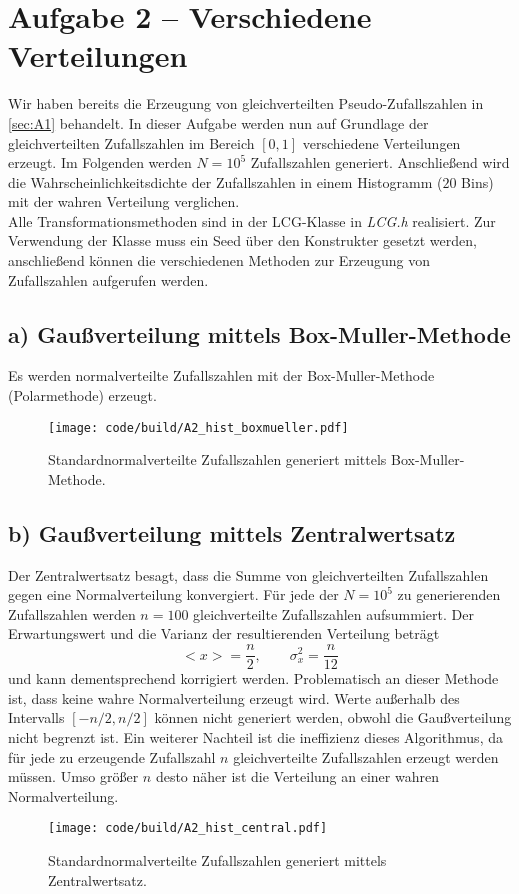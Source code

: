 \section{Aufgabe 2 – Verschiedene Verteilungen}
\label{sec:A2}
Wir haben bereits die Erzeugung von gleichverteilten Pseudo-Zufallszahlen in \autoref{sec:A1} behandelt.
In dieser Aufgabe werden nun auf Grundlage der gleichverteilten Zufallszahlen im Bereich $[0,1]$ verschiedene Verteilungen erzeugt.
Im Folgenden werden $N = 10^5$ Zufallszahlen generiert.
Anschließend wird die Wahrscheinlichkeitsdichte der Zufallszahlen in einem Histogramm ($20$ Bins) mit der wahren Verteilung verglichen.
\\
Alle Transformationsmethoden sind in der LCG-Klasse in \textit{LCG.h} realisiert.
Zur Verwendung der Klasse muss ein Seed über den Konstrukter gesetzt werden, anschließend können die verschiedenen Methoden zur Erzeugung von Zufallszahlen aufgerufen werden.

\subsection{a) Gaußverteilung mittels Box-Muller-Methode}
Es werden normalverteilte Zufallszahlen mit der Box-Muller-Methode (Polarmethode) erzeugt.
\begin{figure}
    \centering
    \texttt{[image: code/build/A2\_hist\_boxmueller.pdf]}
    \caption{Standardnormalverteilte Zufallszahlen generiert mittels Box-Muller-Methode.}
\end{figure}
\FloatBarrier

\subsection{b) Gaußverteilung mittels Zentralwertsatz}
Der Zentralwertsatz besagt, dass die Summe von gleichverteilten Zufallszahlen gegen eine Normalverteilung konvergiert.
Für jede der $N=10^5$ zu generierenden Zufallszahlen werden $n=100$ gleichverteilte Zufallszahlen aufsummiert.
Der Erwartungswert und die Varianz der resultierenden Verteilung beträgt
\begin{equation}
    <x> = \frac{n}{2}, \qquad \sigma_x^2 = \frac{n}{12} 
\end{equation}
und kann dementsprechend korrigiert werden.
Problematisch an dieser Methode ist, dass keine wahre Normalverteilung erzeugt wird.
Werte außerhalb des Intervalls $[-n/2, n/2]$ können nicht generiert werden, obwohl die Gaußverteilung nicht begrenzt ist.
Ein weiterer Nachteil ist die ineffizienz dieses Algorithmus, da für jede zu erzeugende Zufallszahl $n$ gleichverteilte Zufallszahlen erzeugt werden müssen.
Umso größer $n$ desto näher ist die Verteilung an einer wahren Normalverteilung.
\begin{figure}
    \centering
    \texttt{[image: code/build/A2\_hist\_central.pdf]}
    \caption{Standardnormalverteilte Zufallszahlen generiert mittels Zentralwertsatz.}
\end{figure}
\FloatBarrier

